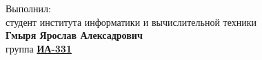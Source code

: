 \begin{flushright}
Выполнил:\\
\hspace*{1.2cm}студент института информатики и вычислительной техники \\ \textbf{Гмыря Ярослав Алексадрович}\\
группа \underline{\textbf{ИА-331}}\\[1em]
\end{flushright}







